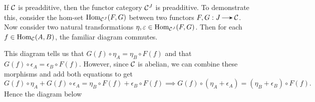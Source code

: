 \begin{example}
    If $\mathcal{C}$ is preadditive, then the functor category $\mathcal{C}^J$ is preadditive.
    To demonstrate this, consider the hom-set $\operatorname{\mathrm{Hom}}_{\mathcal{C}^J}(F, G)$ between two 
    functors $F, G: J \to \cc$. Now consider
    two natural transformations $\eta, \varepsilon \in \operatorname{\mathrm{Hom}}_{\mathcal{C}^J}(F, G)$. Then 
    for each $f \in \operatorname{\mathrm{Hom}}_{\mathcal{C}}(A, B)$, the familiar diagram commutes. 
    \begin{center}
        \hspace{1cm}
    \end{center}
    This diagram tells us that $G(f) \circ \eta_A  = \eta_B \circ F(f)$ 
    and that $G(f) \circ \epsilon_A  = \epsilon_B \circ F(f)$. However, since 
    $\mathcal{C}$ is abelian, we can combine these morphisms and add both equations 
    to get 
    \[
        G(f) \circ \eta_A + G(f) \circ \epsilon_A = \eta_B \circ F(f) + \epsilon_B \circ 
        F(f) 
        \implies G(f) \circ (\eta_A + \epsilon_A) = (\eta_B + \epsilon_B) \circ F(f).
    \]  
    Hence the diagram below 
    \begin{center}
        \hspace{1cm}
\end{center}
\end{example}
